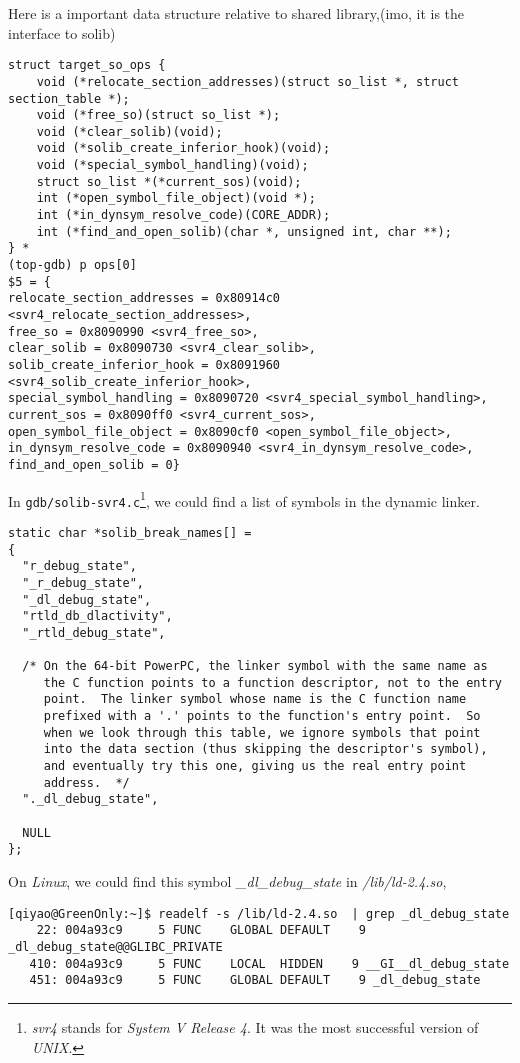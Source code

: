 \documentclass[12pt]{book}
\begin{document}
\begin{CJK}{UTF8}{gbsn}
Here is a important data structure relative to shared library,(imo, it is the interface to solib)
\begin{verbatim}
struct target_so_ops {
    void (*relocate_section_addresses)(struct so_list *, struct section_table *);
    void (*free_so)(struct so_list *);
    void (*clear_solib)(void);
    void (*solib_create_inferior_hook)(void);
    void (*special_symbol_handling)(void);
    struct so_list *(*current_sos)(void);
    int (*open_symbol_file_object)(void *);
    int (*in_dynsym_resolve_code)(CORE_ADDR);
    int (*find_and_open_solib)(char *, unsigned int, char **);
} *
(top-gdb) p ops[0]
$5 = {
relocate_section_addresses = 0x80914c0 <svr4_relocate_section_addresses>, 
free_so = 0x8090990 <svr4_free_so>, 
clear_solib = 0x8090730 <svr4_clear_solib>, 
solib_create_inferior_hook = 0x8091960 <svr4_solib_create_inferior_hook>, 
special_symbol_handling = 0x8090720 <svr4_special_symbol_handling>, 
current_sos = 0x8090ff0 <svr4_current_sos>,
open_symbol_file_object = 0x8090cf0 <open_symbol_file_object>, 
in_dynsym_resolve_code = 0x8090940 <svr4_in_dynsym_resolve_code>, 
find_and_open_solib = 0}

\end{verbatim}

In \texttt{gdb/solib-svr4.c}\footnote{\emph{svr4} stands for \emph{System V Release 4}.  It was the most successful version of \emph{UNIX}.}, 
we could find a list of symbols in the dynamic linker.
\begin{verbatim}
static char *solib_break_names[] =
{
  "r_debug_state",
  "_r_debug_state",
  "_dl_debug_state",
  "rtld_db_dlactivity",
  "_rtld_debug_state",

  /* On the 64-bit PowerPC, the linker symbol with the same name as
     the C function points to a function descriptor, not to the entry
     point.  The linker symbol whose name is the C function name
     prefixed with a '.' points to the function's entry point.  So
     when we look through this table, we ignore symbols that point
     into the data section (thus skipping the descriptor's symbol),
     and eventually try this one, giving us the real entry point
     address.  */
  "._dl_debug_state",

  NULL
};
\end{verbatim}

On \emph{Linux}, we could find this symbol \emph{\_dl\_debug\_state}
in \emph{/lib/ld-2.4.so},
\begin{verbatim}
[qiyao@GreenOnly:~]$ readelf -s /lib/ld-2.4.so  | grep _dl_debug_state
    22: 004a93c9     5 FUNC    GLOBAL DEFAULT    9 _dl_debug_state@@GLIBC_PRIVATE
   410: 004a93c9     5 FUNC    LOCAL  HIDDEN    9 __GI__dl_debug_state
   451: 004a93c9     5 FUNC    GLOBAL DEFAULT    9 _dl_debug_state
\end{verbatim}


\end{CJK}
\end{document}
